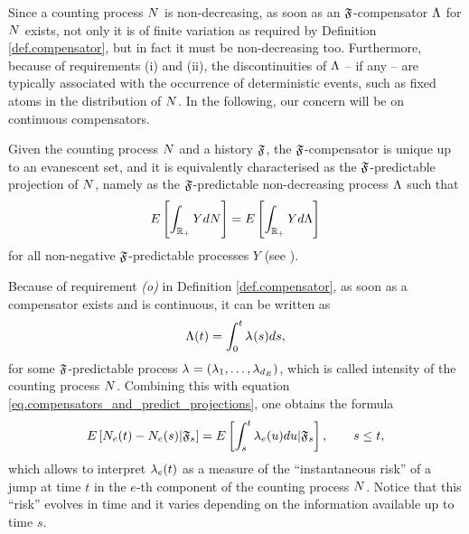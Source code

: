 \documentclass[10pt, article,table]{article}
\begin{document}
Since a counting process $\multiCountingProc$ is non-decreasing, as soon as an $\filtrationF$-compensator $\compensator$ for $\multiCountingProc$ exists, not only it is of finite variation as required by Definition \ref{def.compensator}, but in fact it must be non-decreasing too. Furthermore, because of requirements (i) and (ii), the discontinuities of $\compensator$ -- if any -- are typically associated with the occurrence of deterministic events, such as fixed atoms in the distribution of $\multiCountingProc$. In the following, our concern will be on continuous compensators.

Given the counting process $\multiCountingProc$ and a history $\filtrationF$, the $\filtrationF$-compensator is unique up to an evanescent set, and it is equivalently characterised as the $\filtrationF$-predictable projection of $\multiCountingProc$, namely as the $\filtrationF$-predictable non-decreasing process $\compensator$ such that 
\begin{equation}\label{eq.compensators_and_predict_projections}
 \Expectation \left[ \int_{\R_+} Y d\multiCountingProc\right]
 = 
 \Expectation \left[ \int_{\R_+} Y d\compensator\right]
\end{equation}
for all non-negative $\filtrationF$-predictable processes $Y$ (see \citealp[Proposition 14.2.II]{DVJ08int}). 

Because of requirement \textit{(o)} in Definition \ref{def.compensator}, as soon as a compensator exists and is continuous, it can be written as 
\begin{equation*}
 \compensator (t) = \intzerot \intensity[ ](s)ds,
\end{equation*}
for some $\filtrationF$-predictable process $\intensity[ ]=(\intensity[1],\dots,\intensity[\numEventTypes])$, which is called intensity of the counting process $\multiCountingProc$. Combining this with equation \eqref{eq.compensators_and_predict_projections}, one obtains the formula 
\begin{equation*}
 \Expectation\left[ \countingProc(t)-\countingProc(s) \vert \filtrationF_s \right]
 =
 \Expectation\left[ \int_{s}^{t} \intensity(u) du
  \vert \filtrationF_s \right],
  \qquad  s\leq t,
\end{equation*}
which allows to interpret $\intensity(t)$ as a measure of the ``instantaneous risk'' of a jump at time $t$ in the $e$-th component of the counting process $\multiCountingProc$. Notice that this ``risk'' evolves in time and it varies depending on the information available up to time $s$. 
\end{document}
